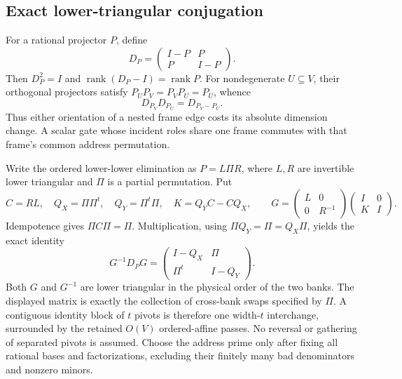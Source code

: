 \subsection{Exact lower-triangular conjugation}
For a rational projector $P$, define
\[
 D_P=\begin{pmatrix}I-P&P\\P&I-P\end{pmatrix}.
\]
Then $D_P^2=I$ and $\operatorname{rank}(D_P-I)=\operatorname{rank}P$.
For nondegenerate $U\subseteq V$, their orthogonal projectors satisfy
$P_UP_V=P_VP_U=P_U$, whence
\[
 D_{P_V}D_{P_U}=D_{P_V-P_U}.
\]
Thus either orientation of a nested frame edge costs its absolute dimension
change. A scalar gate whose incident roles share one frame commutes with
that frame's common address permutation.

Write the ordered lower-lower elimination as $P=L\Pi R$, where $L,R$ are
invertible lower triangular and $\Pi$ is a partial permutation. Put
\[
 C=RL,\quad Q_X=\Pi\Pi^t,\quad Q_Y=\Pi^t\Pi,\quad
 K=Q_YC-CQ_X,\qquad
 G=\begin{pmatrix}L&0\\0&R^{-1}\end{pmatrix}
   \begin{pmatrix}I&0\\K&I\end{pmatrix}.
\]
Idempotence gives $\Pi C\Pi=\Pi$. Multiplication, using
$\Pi Q_Y=\Pi=Q_X\Pi$, yields the exact identity
\[
 G^{-1}D_PG=
 \begin{pmatrix}I-Q_X&\Pi\\\Pi^t&I-Q_Y\end{pmatrix}.
\]
Both $G$ and $G^{-1}$ are lower triangular in the physical order of the
two banks. The displayed matrix is exactly the collection of cross-bank
swaps specified by $\Pi$. A contiguous identity block of $t$ pivots is
therefore one width-$t$ interchange, surrounded by the retained $O(V)$
ordered-affine passes. No reversal or gathering of separated pivots is
assumed. Choose the address prime only after fixing all rational bases
and factorizations, excluding their finitely many bad denominators and
nonzero minors.

